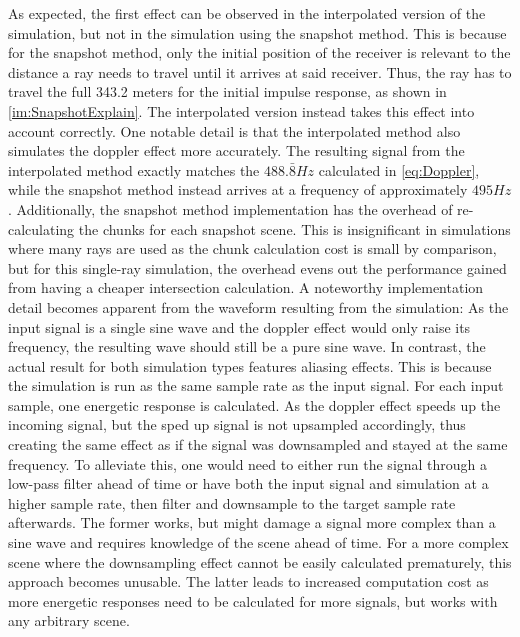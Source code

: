 As expected, the first effect can be observed in the interpolated version of the simulation,
but not in the simulation using the snapshot method.
\newline
This is because for the snapshot method,
only the initial position of the receiver is relevant to the distance a ray needs to travel until it arrives at said receiver.
Thus, the ray has to travel the full 343.2 meters for the initial impulse response, as shown in \ref{im:SnapshotExplain}.
\newline
The interpolated version instead takes this effect into account correctly.
\newline
One notable detail is that the interpolated method also simulates the doppler effect more accurately.
The resulting signal from the interpolated method exactly matches the \(488.\bar{8} Hz\) calculated in \eqref{eq:Doppler},
while the snapshot method instead arrives at a frequency of approximately \(495 Hz\).
\newline
Additionally, the snapshot method implementation has the overhead of re-calculating
the chunks for each snapshot scene.
This is insignificant in simulations where many rays are used
as the chunk calculation cost is small by comparison,
but for this single-ray simulation, the overhead evens out the performance gained from having a cheaper intersection calculation.
\newline
A noteworthy implementation detail becomes apparent from the waveform resulting from the simulation:
As the input signal is a single sine wave and the doppler effect would only raise its frequency,
the resulting wave should still be a pure sine wave.
In contrast, the actual result for both simulation types features aliasing effects.
\newline
This is because the simulation is run as the same sample rate as the input signal.
For each input sample, one energetic response is calculated.
As the doppler effect speeds up the incoming signal,
but the sped up signal is not upsampled accordingly,
thus creating the same effect as if the signal was downsampled and stayed at the same frequency.
\newline
To alleviate this, one would need to either run the signal through a low-pass filter ahead of time
or have both the input signal and simulation at a higher sample rate,
then filter and downsample to the target sample rate afterwards.
\newline
The former works, but might damage a signal more complex than a sine wave
and requires knowledge of the scene ahead of time.
For a more complex scene where the downsampling effect cannot be easily calculated prematurely,
this approach becomes unusable.
\newline
The latter leads to increased computation cost as more energetic responses need to be calculated for more signals,
but works with any arbitrary scene.

